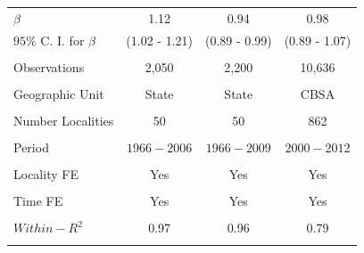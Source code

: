 \documentclass[dv_diss_main.tex]{subfiles}
\begin{document}
\begin{table}[!ht]
\begin{center}
{\begin{tabular}{l ccc}
    $\beta$ & 1.12 & 0.94 & 0.98 \\
    $95\%$ C. I. for $\beta$ & (1.02 - 1.21) & (0.89 - 0.99) & (0.89 - 1.07) \\
    \vspace{-0.7pt} & \vspace{-0.7pt} & \vspace{-0.7pt} & \vspace{-0.7pt} \\
    Observations & 2,050 & 2,200 & 10,636 \\
    \vspace{-3pt} & \vspace{-3pt} & \vspace{-3pt}& \vspace{-3pt} \\
    Geographic Unit & State & State & CBSA \\
    \vspace{-3pt} & \vspace{-3pt} & \vspace{-3pt}& \vspace{-3pt} \\
    Number Localities & 50 & 50 & 862 \\
    \vspace{-3pt} & \vspace{-3pt} & \vspace{-3pt} & \vspace{-3pt} \\
    Period & $1966-2006$ & $1966-2009$ & $2000-2012$ \\
    \vspace{-3pt} & \vspace{-3pt} & \vspace{-3pt} & \vspace{-3pt} \\
    Locality FE & Yes & Yes & Yes \\
    \vspace{-3pt} & \vspace{-3pt} & \vspace{-3pt} & \vspace{-3pt} \\
    Time FE & Yes & Yes & Yes \\
    \vspace{-3pt} & \vspace{-3pt} & \vspace{-3pt} & \vspace{-3pt} \\
    $Within-R^{2}$ & 0.97 & 0.96 & 0.79 \\
    \vspace{-2pt} & \vspace{-2pt} & \vspace{-2pt} & \vspace{-2pt} \\ \hline 
    

\end{tabular}}
\end{center}
\end{table}
\end{document}
